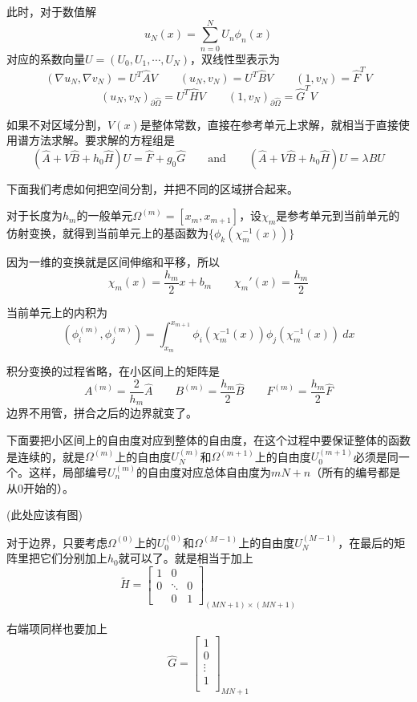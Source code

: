 \documentclass[UTF8,12pt]{article}
\begin{document}
此时，对于数值解
$$ u_N(x) = \sum_{n = 0}^{N} U_{n} \phi_n(x) $$
对应的系数向量$U = (U_0, U_1, \cdots, U_N)$，双线性型表示为
$$ (\nabla u_N, \nabla v_N) = U^T \hat{A} V \qquad (u_N, v_N) = U^T \hat{B} V \qquad (1, v_N) = \hat{F}^T V $$
$$ (u_N, v_N)_{\partial\hat{\Omega}} = U^T \hat{H} V \qquad (1, v_N)_{\partial\hat{\Omega}} = \hat{G}^T V $$

如果不对区域分割，$V(x)$是整体常数，直接在参考单元上求解，就相当于直接使用谱方法求解。要求解的方程组是
\begin{equation}
(\hat{A} + V \hat{B} + h_0 \hat{H}) U = \hat{F} + g_0 \hat{G} \qquad \text{and} \qquad (\hat{A} + V \hat{B} + h_0 \hat{H}) U = \lambda \hat{B} U
\end{equation}


下面我们考虑如何把空间分割，并把不同的区域拼合起来。

对于长度为$h_m$的一般单元$\Omega^{(m)} = [x_m, x_{m+1}]$，设$\chi_m$是参考单元到当前单元的仿射变换，就得到当前单元上的基函数为$\{\phi_{k}(\chi_m^{-1}(x))\}$

因为一维的变换就是区间伸缩和平移，所以
$$ \chi_m(x) = \frac{h_m}{2} x + b_m \qquad \chi_m'(x) = \frac{h_m}{2} $$

当前单元上的内积为
$$ (\phi^{(m)}_i, \phi^{(m)}_j) = \int_{x_m}^{x_{m+1}} \phi_{i}(\chi_m^{-1}(x)) \phi_{j}(\chi_m^{-1}(x)) \ dx $$

积分变换的过程省略，在小区间上的矩阵是
$$ A^{(m)} = \frac{2}{h_m} \hat{A} \qquad B^{(m)} = \frac{h_m}{2} \hat{B} \qquad F^{(m)} = \frac{h_m}{2} \hat{F} $$
边界不用管，拼合之后的边界就变了。

下面要把小区间上的自由度对应到整体的自由度，在这个过程中要保证整体的函数是连续的，就是$\Omega^{(m)}$上的自由度$U^{(m)}_N$和$\Omega^{(m+1)}$上的自由度$U^{(m+1)}_0$必须是同一个。这样，局部编号$U^{(m)}_n$的自由度对应总体自由度为$m N + n$（所有的编号都是从0开始的）。

(此处应该有图)

对于边界，只要考虑$\Omega^{(0)}$上的$U^{(0)}_0$和$\Omega^{(M-1)}$上的自由度$U^{(M-1)}_N$，在最后的矩阵里把它们分别加上$h_0$就可以了。就是相当于加上
\begin{equation}
\tilde{H} = \left[ \begin{array}{ccc}
1 & 0 &  \\ 
0 & \ddots & 0 \\ 
& 0 & 1
\end{array} \right]_{(MN+1) \times (MN+1)}
\end{equation}

右端项同样也要加上
\begin{equation}
\hat{G} = \left[ \begin{array}{c}
1 \\
0 \\
\vdots \\
1 \\
\end{array} \right]_{MN+1}
\end{equation}
\end{document}
